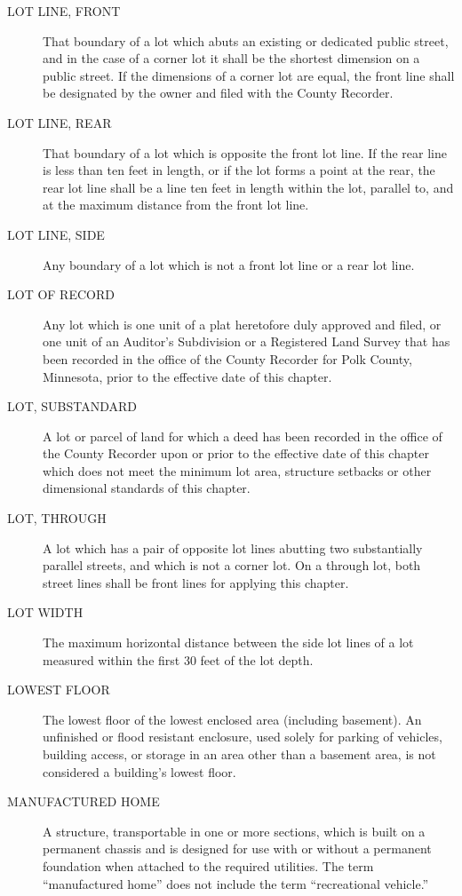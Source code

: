 \begin{description}
    \item[LOT LINE, FRONT] That boundary of a lot which abuts an existing or dedicated public street, and in the case of a corner lot it shall be the shortest dimension on a public street. If the dimensions of a corner lot are equal, the front line shall be designated by the owner and filed with the County Recorder.
    \item[LOT LINE, REAR] That boundary of a lot which is opposite the front lot line.  If the rear line is less than ten feet in length, or if the lot forms a point at the rear, the rear lot line shall be a line ten feet in length within the lot, parallel to, and at the maximum distance from the front lot line.
    \item[LOT LINE, SIDE] Any boundary of a lot which is not a front lot line or a rear lot line.
    \item[LOT OF RECORD] Any lot which is one unit of a plat heretofore duly approved and filed, or one unit of an Auditor’s Subdivision or a Registered Land Survey that has been recorded in the office of the County Recorder for Polk County, Minnesota, prior to the effective date of this chapter.
    \item[LOT, SUBSTANDARD] A lot or parcel of land for which a deed has been recorded in the office of the County Recorder upon or prior to the effective date of this chapter which does not meet the minimum lot area, structure setbacks or other dimensional standards of this chapter.
    \item[LOT, THROUGH] A lot which has a pair of opposite lot lines abutting two substantially parallel streets, and which is not a corner lot. On a through lot, both street lines shall be front lines for applying this chapter.
    \item[LOT WIDTH] The maximum horizontal distance between the side lot lines of a lot measured within the first 30 feet of the lot depth.
    \item[LOWEST FLOOR] The lowest floor of the lowest enclosed area (including basement). An unfinished or flood resistant enclosure, used solely for parking of vehicles, building access, or storage in an area other than a basement area, is not considered a building’s lowest floor.
    \item[MANUFACTURED HOME] A structure, transportable in one or more sections, which is built on a permanent chassis and is designed for use with or without a permanent foundation when attached to the required utilities. The term “manufactured home” does not include the term “recreational vehicle.”

\end{description}
